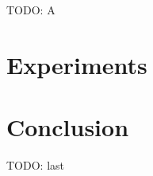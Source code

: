 \documentclass{IOS-Book-Article}
\begin{document}
TODO: A



\section{Experiments}
\label{sec:experiments}



\section{Conclusion}

TODO: last




\begin{thebibliography}{99}



\end{thebibliography}
\end{document}
